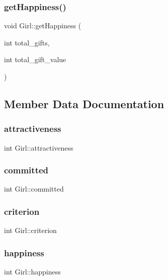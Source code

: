\subsubsection{\texorpdfstring{get\+Happiness()}{getHappiness()}}
{\footnotesize\ttfamily void Girl\+::get\+Happiness (\begin{DoxyParamCaption}\item[{int}]{total\+\_\+gifts,  }\item[{int}]{total\+\_\+gift\+\_\+value }\end{DoxyParamCaption})}



\subsection{Member Data Documentation}
\mbox{\label{class_girl_ab97bd68f8bc0ab5ee3fb9d2784ed1474}} 
\subsubsection{\texorpdfstring{attractiveness}{attractiveness}}
{\footnotesize\ttfamily int Girl\+::attractiveness}

\mbox{\label{class_girl_ac5829e7ec762f1a3fb7484acfd6c1680}} 
\subsubsection{\texorpdfstring{committed}{committed}}
{\footnotesize\ttfamily int Girl\+::committed}

\mbox{\label{class_girl_a1a2a395adc6fdf036a4487892ea4cebb}} 
\subsubsection{\texorpdfstring{criterion}{criterion}}
{\footnotesize\ttfamily int Girl\+::criterion}

\mbox{\label{class_girl_a50337447735a8f518fd817338d04d5b9}} 
\subsubsection{\texorpdfstring{happiness}{happiness}}
{\footnotesize\ttfamily int Girl\+::happiness}

